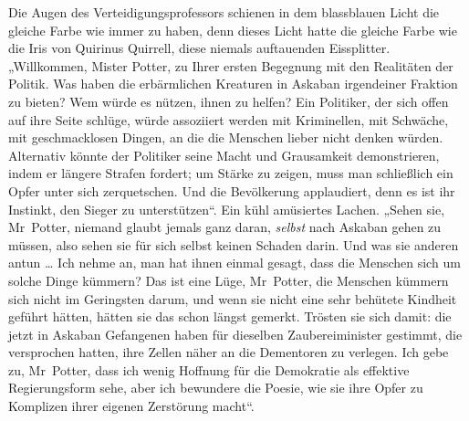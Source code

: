 Die Augen des Verteidigungsprofessors schienen in dem blassblauen Licht die gleiche Farbe wie immer zu haben, denn dieses Licht hatte die gleiche Farbe wie die Iris von Quirinus Quirrell, diese niemals auftauenden Eissplitter.
„Willkommen, Mister Potter, zu Ihrer ersten Begegnung mit den Realitäten der Politik. Was haben die erbärmlichen Kreaturen in Askaban irgendeiner Fraktion zu bieten? Wem würde es nützen, ihnen zu helfen? Ein Politiker, der sich offen auf ihre Seite schlüge, würde assoziiert werden mit Kriminellen, mit Schwäche, mit geschmacklosen Dingen, an die die Menschen lieber nicht denken würden. Alternativ könnte der Politiker seine Macht und Grausamkeit demonstrieren, indem er längere Strafen fordert; um Stärke zu zeigen, muss man schließlich ein Opfer unter sich zerquetschen. Und die Bevölkerung applaudiert, denn es ist ihr Instinkt, den Sieger zu unterstützen“. Ein kühl amüsiertes Lachen.
„Sehen sie, Mr~Potter, niemand glaubt jemals ganz daran, \emph{selbst} nach Askaban gehen zu müssen, also sehen sie für sich selbst keinen Schaden darin. Und was sie anderen antun … Ich nehme an, man hat ihnen einmal gesagt, dass die Menschen sich um solche Dinge kümmern? Das ist eine Lüge, Mr~Potter, die Menschen kümmern sich nicht im Geringsten darum, und wenn sie nicht eine sehr behütete Kindheit geführt hätten, hätten sie das schon längst gemerkt. Trösten sie sich damit: die jetzt in Askaban Gefangenen haben für dieselben Zaubereiminister gestimmt, die versprochen hatten, ihre Zellen näher an die Dementoren zu verlegen. Ich gebe zu, Mr~Potter, dass ich wenig Hoffnung für die Demokratie als effektive Regierungsform sehe, aber ich bewundere die Poesie, wie sie ihre Opfer zu Komplizen ihrer eigenen Zerstörung macht“.

